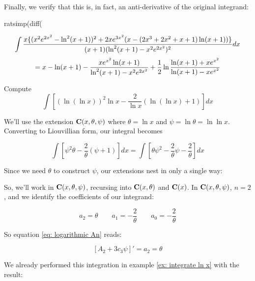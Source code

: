 Finally, we verify that this is, in fact,
an anti-derivative of the original integrand:

\begin{maximacode}
ratsimp(diff(%
\end{maximacode}

$$\int{{x\{(x^2e^{2x^2}-\ln^2(x+1))^2+2xe^{3x^2}(x-(2x^3+2x^2+x+1)\ln(x+1))\}}\over{(x+1)(\ln^2(x+1) - x^2e^{2x^2})^2}} dx$$
$$= x - \ln(x+1) - {x e^{x^2}\ln(x+1)\over{\ln^2(x+1)-x^2 e^{2x^2}}}
+ {1\over2}\ln\frac{\ln(x+1) + x e^{x^2}}{\ln(x+1) - x e^{x^2}}$$

\endexample

\vfill\eject

\example
\label{double-log integral}
Compute
$$\int \left[ (\ln(\ln x))^2 \ln x - \frac{2}{\ln x}(\ln(\ln x) +1) \right] dx$$

We'll use the extension ${\bf C}(x,\theta,\psi)$
where $\theta = \ln x$ and $\psi = \ln \theta = \ln \ln x$.
Converting to Liouvillian form, our integral becomes

$$\int \left[ \psi^2 \theta - \frac{2}{\theta}(\psi+1) \right] dx
= \int \left[ \theta \psi^2 - \frac{2}{\theta}\psi - \frac{2}{\theta} \right] dx$$

Since we need $\theta$ to construct $\psi$, our extensions nest
in only a single way:

\begin{center}
\end{center}

So, we'll work in ${\bf C}(x,\theta,\psi)$, recursing into
${\bf C}(x,\theta)$ and ${\bf C}(x)$.  In ${\bf C}(x,\theta,\psi)$,
$n=2$, and we identify the coefficients of our integrand:

$$a_2 = \theta \qquad a_1 = - \frac{2}{\theta} \qquad a_0 = - \frac{2}{\theta}$$

So equation \eqref{eq: logarithmic An} reads:

$$\left[ A_2 + 3 c_3 \psi \right]' = a_2 = \theta$$

We already performed this integration in example \ref{ex: integrate ln x}
with the result:

